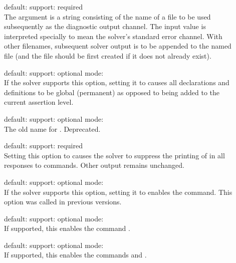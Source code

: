\begin{description}

\item[] 
\quad default: 
\quad support: required
\\
The argument is a string consisting of the name of a file to be used subsequently 
as the diagnostic output channel.
The input value  is interpreted specially to mean 
the solver's standard error channel.  
With other filenames, subsequent solver output is to be appended to the named file 
(and the file should be first created if it does not  already exist).

\item[] 
\quad default: 
\quad support: optional
\quad mode: 
\\
If the solver supports this option, setting it to  causes all
declarations and definitions to be global (permanent) as opposed to being added
to the current assertion level.

\item[] 
\quad default: 
\quad support: optional
\quad mode: 
\\
The old name for . 
Deprecated.

\item[] 
\quad default: 
\quad support: required
\\
Setting this option to  causes the solver to suppress the printing 
of  in all responses to commands.  
Other output remains unchanged.

\item[] 
\quad default: 
\quad support: optional
\quad mode: 
\\
If the solver supports this option, setting it to  enables 
the  command.
This option was called  in previous versions.

\item[] 
\quad default: 
\quad support: optional
\quad mode: 
\\
If supported, this enables the command .  

\item[] 
\quad default: 
\quad support: optional
\quad mode: 
\\
If supported, this enables the commands  and .  


\end{description}
